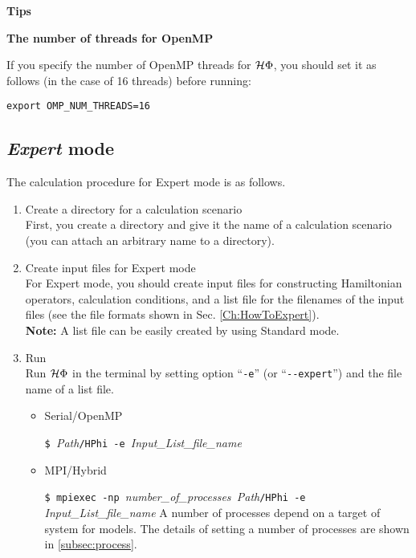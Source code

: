 \begin{screen}
\Large 
{\bf Tips}
\normalsize

{\bf The number of threads for OpenMP}

If you specify the number of OpenMP threads for $\mathcal{H} \Phi$,
you should set it as follows (in the case of 16 threads) before running:
\begin{verbatim}
export OMP_NUM_THREADS=16
\end{verbatim}

\end{screen}

\subsection{{\it Expert} mode}
The calculation procedure for Expert mode is as follows.
 \begin{enumerate}
   \item Create a directory for a calculation scenario \\
     First, you create a directory and give it the name of a calculation scenario
     (you can attach an arbitrary name to a directory).
   \item Create input files for Expert mode\\
     For Expert mode, you should create input files 
     for constructing Hamiltonian operators, calculation conditions, and 
     a list file for the filenames of the input files
     (see the file formats shown in Sec. \ref{Ch:HowToExpert}). \\
     {\bf Note:} A list file can be easily created by using Standard mode.
 \item  Run\\
   Run $\mathcal{H} \Phi$ in the terminal by setting option ``\verb|-e|''
   (or ``\verb|--expert|'') and the file name of a list file.\\

\begin{itemize}

\item Serial/OpenMP

  \verb|$ |\textit{Path}\verb|/HPhi -e |\textit{Input\_List\_file\_name}
  
\item MPI/Hybrid

  \verb|$ mpiexec -np |\textit{number\_of\_processes}\verb| |\textit{Path}\verb|/HPhi -e |\textit{Input\_List\_file\_name}
 {A number of processes depend on a target of system for models. The details of setting a number of processes are shown in  \ref{subsec:process}.}
\end{itemize}


\end{enumerate}
